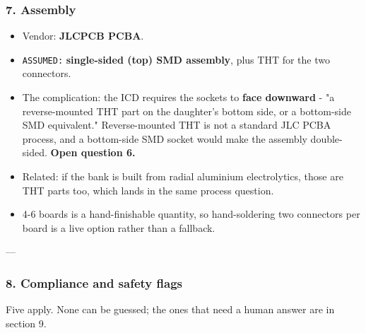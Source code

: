 \documentclass[11pt,a4paper]{article}
\begin{document}
\subsubsection*{7. Assembly}
\begin{itemize}
\item Vendor: \textbf{JLCPCB PCBA}.
\item \texttt{ASSUMED:} \textbf{single-sided (top) SMD assembly}, plus THT for the two connectors.
\item The complication: the ICD requires the sockets to \textbf{face downward} - "a reverse-mounted THT
part on the daughter's bottom side, or a bottom-side SMD equivalent." Reverse-mounted THT is
not a standard JLC PCBA process, and a bottom-side SMD socket would make the assembly
double-sided. \textbf{Open question 6.}
\item Related: if the bank is built from radial aluminium electrolytics, those are THT parts too,
which lands in the same process question.
\item 4-6 boards is a hand-finishable quantity, so hand-soldering two connectors per board is a
live option rather than a fallback.
\end{itemize}
---

\subsubsection*{8. Compliance and safety flags}
Five apply. None can be guessed; the ones that need a human answer are in section 9.
\end{document}
